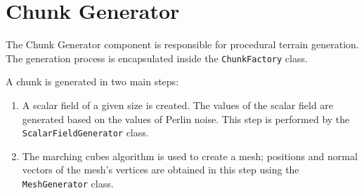 \section{Chunk Generator} \label{chunk_generator}
The Chunk Generator component is responsible for procedural terrain generation.
The generation process is encapsulated inside the \texttt{ChunkFactory} class.

A chunk is generated in two main steps:
\begin{enumerate}
    \item A scalar field of a given size is created.
          The values of the scalar field are generated based on the values of Perlin noise.
          This step is performed by the \texttt{ScalarFieldGenerator} class.
    \item The marching cubes algorithm is used to create a mesh;
          positions and normal vectors of the mesh's vertices are obtained in this step using the \texttt{MeshGenerator} class.
\end{enumerate}